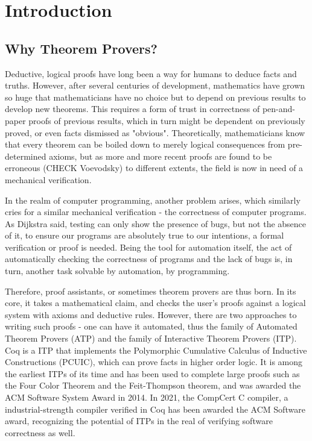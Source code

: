 \chapter{Introduction}

\section{Why Theorem Provers?}
Deductive, logical proofs have long been a way for humans to deduce facts and
truths. However, after several centuries of development, mathematics have grown
so huge that mathematicians have no choice but to depend on previous results to
develop new theorems. This requires a form of trust in correctness of
pen-and-paper proofs of previous results, which in turn might be dependent on
previously proved, or even facts dismissed as "obvious". Theoretically,
mathematicians know that every theorem can be boiled down to merely logical
consequences from pre-determined axioms, but as more and more recent proofs are
found to be erroneous (CHECK Voevodsky) to different extents, the field is now
in need of a mechanical verification.

In the realm of computer programming, another problem arises, which similarly
cries for a similar mechanical verification - the correctness of computer
programs. As Dijkstra said, testing can only show the presence of bugs, but not
the absence of it, to ensure our programs are absolutely true to our intentions,
a formal verification or proof is needed. Being the tool for automation itself,
the act of automatically checking the correctness of programs and the lack of
bugs is, in turn, another task solvable by automation, by programming.

Therefore, proof assistants, or sometimes theorem provers are thus born. In its
core, it takes a mathematical claim, and checks the user's proofs against a
logical system with axioms and deductive rules. However, there are two
approaches to writing such proofs - one can have it automated, thus the family
of Automated Theorem Provers (ATP) and the family of Interactive Theorem Provers
(ITP). Coq is a ITP that implements the Polymorphic Cumulative Calculus of
Inductive Constructions (PCUIC), which can prove facts in higher order logic. It
is among the earliest ITPs of its time and has been used to complete large
proofs such as the Four Color Theorem and the Feit-Thompson theorem, and was
awarded the ACM Software System Award in 2014. In 2021, the CompCert C compiler,
a industrial-strength compiler verified in Coq has been awarded the ACM Software
award, recognizing the potential of ITPs in the real of verifying software
correctness as well.

